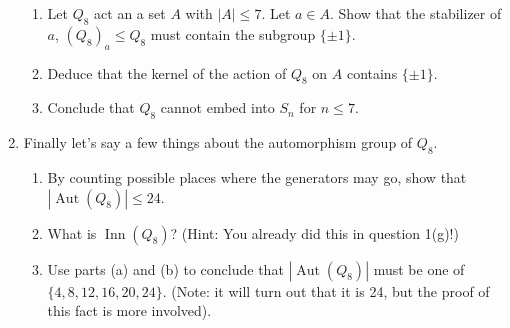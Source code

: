 \documentclass[11pt]{article}
\newcommand{\Aut}{\operatorname{Aut}}
\newcommand{\Inn}{\operatorname{Inn}}
\begin{document}
\begin{enumerate}
  \begin{enumerate}
    \item Let $Q_8$ act an a set $A$ with $|A|\le 7$.  Let $a\in A$.  Show that the stabilizer of $a$,  $(Q_8)_a\le Q_8$ must contain the subgroup $\{\pm1\}$.
    \item Deduce that the kernel of the action of $Q_8$ on $A$ contains $\{\pm1\}$.
    \item Conclude that $Q_8$ cannot embed into $S_n$ for $n\le7$.
  \end{enumerate}
  \item Finally let's say a few things about the automorphism group of $Q_8$.
  \begin{enumerate}
    \item By counting possible places where the generators may go, show that $|\Aut(Q_8)|\le 24$.
    \item What is $\Inn(Q_8)$? (Hint: You already did this in question 1(g)!)
    \item Use parts (a) and (b) to conclude that $|\Aut(Q_8)|$ must be one of $\{4,8,12,16,20,24\}$.  (Note: it will turn out that it is 24, but the proof of this fact is more involved).
  \end{enumerate}
\end{enumerate}
\end{document}
